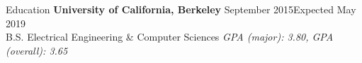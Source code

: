 \documentclass{resume} %
\begin{document}




\begin{rSection}{Education}
{\bf University of California, Berkeley} \hfill {September 2015\textminus Expected May 2019} \\ 
B.S. Electrical Engineering \& Computer Sciences \hfill {\em GPA (major): 3.80, GPA (overall): 3.65}
\end{rSection}

\end{document}
